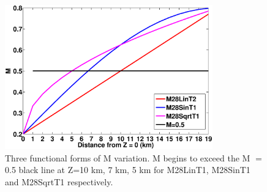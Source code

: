 \begin{figure}[h]
  \centering
    \includegraphics[width=0.8\textwidth]{./Figures/fig_Results_3_3_M_variation.eps}
  \caption{Three functional forms of M variation. M begins to exceed the M $=$ 0.5 black line at Z=10 km, 7 km, 5 km for M28LinT1, M28SinT1 and M28SqrtT1 respectively.}
 \label{fig_Results3_1}
\end{figure}   

